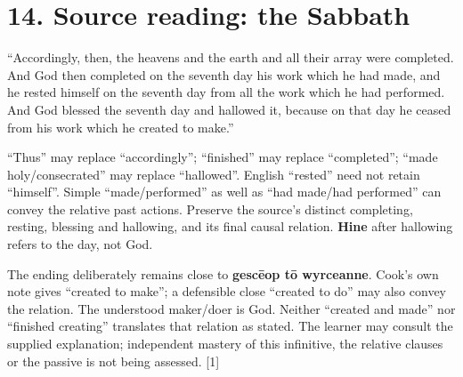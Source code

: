 \par\begin{minipage}{\linewidth}\raggedright

\end{minipage}\par\addvspace{4pt}

\section*{14. Source reading: the Sabbath}

\par\begin{minipage}{\linewidth}\raggedright

“Accordingly, then, the heavens and the earth and all their array were completed. And God then completed on the seventh day his work which he had made, and he rested himself on the seventh day from all the work which he had performed. And God blessed the seventh day and hallowed it, because on that day he ceased from his work which he created to make.”

“Thus” may replace “accordingly”; “finished” may replace “completed”; “made holy/\allowbreak{}consecrated” may replace “hallowed”. English “rested” need not retain “himself”. Simple “made/\allowbreak{}performed” as well as “had made/\allowbreak{}had performed” can convey the relative past actions. Preserve the source’s distinct completing, resting, blessing and hallowing, and its final causal relation. \textbf{Hine} after hallowing refers to the day, not God.

The ending deliberately remains close to \textbf{gescēop tō wyrceanne}. Cook’s own note gives “created to make”; a defensible close “created to do” may also convey the relation. The understood maker/\allowbreak{}doer is God. Neither “created and made” nor “finished creating” translates that relation as stated. The learner may consult the supplied explanation; independent mastery of this infinitive, the relative clauses or the passive is not being assessed. [1]

\end{minipage}\par\addvspace{4pt}

